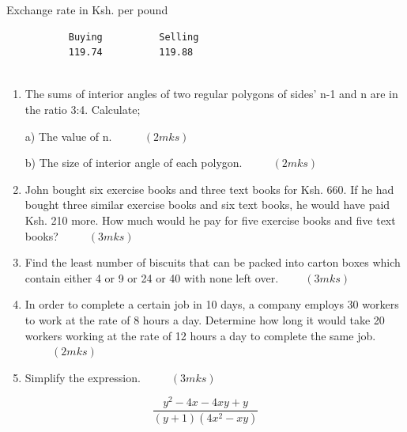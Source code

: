 \documentclass[
  a4paperpaper,
]{scrbook}
\begin{document}
\begin{tcolorbox}
\begin{enumerate}
  Exchange rate in Ksh. per pound
\end{enumerate}

\begin{verbatim}
           Buying          Selling
           119.74          119.88
              
\end{verbatim}

\begin{enumerate}
\def\labelenumi{\arabic{enumi}.}
\setcounter{enumi}{5}
\item
  The sums of interior angles of two regular polygons of sides' n-1 and
  n are in the ratio 3:4. Calculate;

  a) The value of n.~\(\hspace{1cm} (2mks)\)

  b) The size of interior angle of each polygon. \(\hspace{1cm} (2mks)\)
\item
  John bought six exercise books and three text books for Ksh. 660. If
  he had bought three similar exercise books and six text books, he
  would have paid Ksh. 210 more. How much would he pay for five exercise
  books and five text books? \(\hspace{1cm} (3mks)\)
\item
  Find the least number of biscuits that can be packed into carton boxes
  which contain either 4 or 9 or 24 or 40 with none left
  over.\(\hspace{1cm} (3mks)\)
\item
  In order to complete a certain job in 10 days, a company employs 30
  workers to work at the rate of 8 hours a day. Determine how long it
  would take 20 workers working at the rate of 12 hours a day to
  complete the same job. \(\hspace{1cm} (2mks)\)
\item
  Simplify the expression. \(\hspace{1cm} (3mks)\)
\end{enumerate}

\[\frac{y^2-4x-4xy+y}{(y+1)(4x^2-xy)}\]


\end{tcolorbox}
\end{document}
